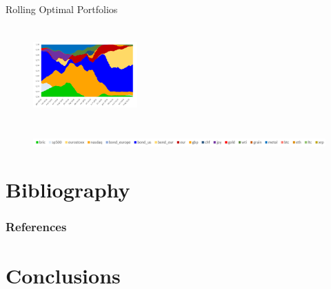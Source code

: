 \documentclass[aspectratio=169]{beamer}
\begin{document}
\begin{frame}[noframenumbering]{Rolling Optimal Portfolios}
\begin{columns}
\begin{column}{0.3\textwidth}
\begin{figure}
                \centering
                \includegraphics[width=4cm, height=3cm]{Images/rolling_allocation/rollstno.png}
            \end{figure}
		\end{column}
	\end{columns}
	\begin{figure}
	    \centering
	    \includegraphics[width=13.5cm]{Images/legend_roll.PNG}
	\end{figure}
\end{frame}

	
\section{Bibliography}

\begin{frame}[allowframebreaks] %
	\frametitle{References}

%
    
	\nocite{cr1}
	\nocite{trading}
	\nocite{correlations}
	\nocite{modernptftheory}
	\nocite{risk}
	\nocite{stazionario}
	\nocite{correl}
	\nocite{crosscorr}
	\nocite{spillover}
	\nocite{corr_stock}
	\nocite{weiyi}
	\nocite{BTC2008}
	\nocite{digitalgold}
	\nocite{klein}
	\nocite{bouri}
	\nocite{corbet}
	\nocite{mark52}
	\nocite{Fabozzi7}
	\nocite{DEoptimR_manual}
	\nocite{quadp}
	\nocite{R}
	\nocite{DEoptim_book}
	\nocite{Meucci}
	\nocite{mark59}
	\nocite{samuele}
	\nocite{CMC}
	\nocite{cryptoindex}
	\nocite{cryptoindex1}

\end{frame}

\section{Conclusions}
\end{document}
